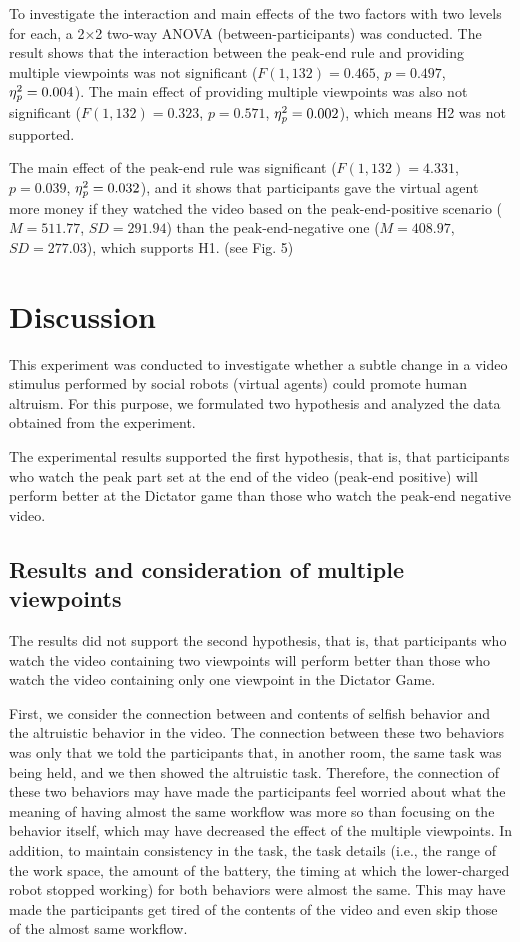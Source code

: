\documentclass[runningheads]{llncs}
\begin{document}
    
To investigate the interaction and main effects of the two factors with two levels for each, a 2×2 two-way ANOVA (between-participants) was conducted. The result shows that the interaction between the peak-end rule and providing multiple viewpoints was not significant ($F(1,132)=0.465$, $p=0.497$, $\eta^2_{\it p}=0.004$). The main effect of providing multiple viewpoints was also not significant ($F(1,132)=0.323$, $p=0.571$, $\eta^2_{\it p}=0.002$), which means H2 was not supported. 


The main effect of the peak-end rule was significant ($F(1,132)=4.331$, $p=0.039$, $\eta^2_{\it p}=0.032$), and it shows that participants gave the virtual agent more money if they watched the video based on the peak-end-positive scenario ($M=511.77$, $SD=291.94$) than the peak-end-negative one ($M=408.97$, $SD=277.03$), which supports H1. (see Fig. 5)







\section{Discussion}
This experiment was conducted to investigate whether a subtle change in a video stimulus performed by social robots (virtual agents) could promote human altruism. For this purpose, we formulated two hypothesis and analyzed the data obtained from the experiment.


The experimental results supported the first hypothesis, that is, that participants who watch the peak part set at the end of the video (peak-end positive) will perform better at the Dictator game than those who watch the peak-end negative video. 


\subsection{Results and consideration of multiple viewpoints}
The results did not support the second hypothesis, that is, that participants who watch the video containing two viewpoints will perform better than those who watch the video containing only one viewpoint in the Dictator Game. 

First, we consider the connection between and contents of selfish behavior and the altruistic behavior in the video. The connection between these two behaviors was only that we told the participants that, in another room, the same task was being held, and we then showed the altruistic task. Therefore, the connection of these two behaviors may have made the participants feel worried about what the meaning of having almost the same workflow was more so than focusing on the behavior itself, which may have decreased the effect of the multiple viewpoints. In addition, to maintain consistency in the task, the task details (i.e., the range of the work space, the amount of the battery, the timing at which the lower-charged robot stopped working) for both behaviors were almost the same. This may have made the participants get tired of the contents of the video and even skip those of the almost same workflow.
\end{document}
